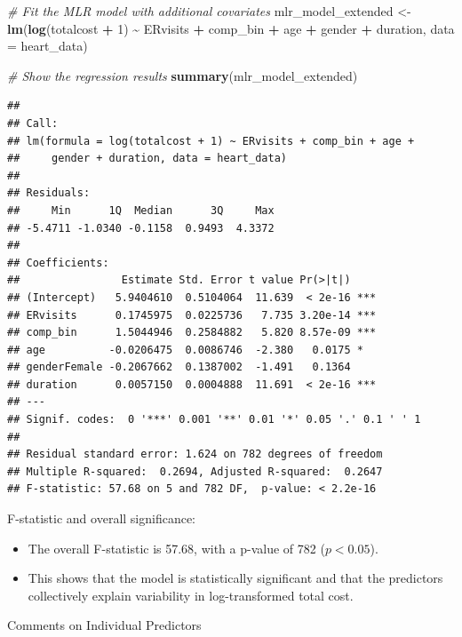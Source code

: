 \documentclass[
]{article}
\newenvironment{Shaded}{\begin{snugshade}}{\end{snugshade}}
\newcommand{\AttributeTok}[1]{\textcolor[rgb]{0.13,0.29,0.53}{#1}}
\newcommand{\CommentTok}[1]{\textcolor[rgb]{0.56,0.35,0.01}{\textit{#1}}}
\newcommand{\DecValTok}[1]{\textcolor[rgb]{0.00,0.00,0.81}{#1}}
\newcommand{\FunctionTok}[1]{\textcolor[rgb]{0.13,0.29,0.53}{\textbf{#1}}}
\newcommand{\NormalTok}[1]{#1}
\newcommand{\OtherTok}[1]{\textcolor[rgb]{0.56,0.35,0.01}{#1}}
\newcommand{\SpecialCharTok}[1]{\textcolor[rgb]{0.81,0.36,0.00}{\textbf{#1}}}
\begin{document}
\begin{Shaded}
\begin{Highlighting}[]
\CommentTok{\# Fit the MLR model with additional covariates}
\NormalTok{mlr\_model\_extended }\OtherTok{\textless{}{-}} \FunctionTok{lm}\NormalTok{(}\FunctionTok{log}\NormalTok{(totalcost }\SpecialCharTok{+} \DecValTok{1}\NormalTok{) }\SpecialCharTok{\textasciitilde{}}\NormalTok{ ERvisits }\SpecialCharTok{+}\NormalTok{ comp\_bin }\SpecialCharTok{+}\NormalTok{ age }\SpecialCharTok{+}\NormalTok{ gender }\SpecialCharTok{+}\NormalTok{ duration, }\AttributeTok{data =}\NormalTok{ heart\_data)}

\CommentTok{\# Show the regression results}
\FunctionTok{summary}\NormalTok{(mlr\_model\_extended)}
\end{Highlighting}
\end{Shaded}

\begin{verbatim}
## 
## Call:
## lm(formula = log(totalcost + 1) ~ ERvisits + comp_bin + age + 
##     gender + duration, data = heart_data)
## 
## Residuals:
##     Min      1Q  Median      3Q     Max 
## -5.4711 -1.0340 -0.1158  0.9493  4.3372 
## 
## Coefficients:
##                Estimate Std. Error t value Pr(>|t|)    
## (Intercept)   5.9404610  0.5104064  11.639  < 2e-16 ***
## ERvisits      0.1745975  0.0225736   7.735 3.20e-14 ***
## comp_bin      1.5044946  0.2584882   5.820 8.57e-09 ***
## age          -0.0206475  0.0086746  -2.380   0.0175 *  
## genderFemale -0.2067662  0.1387002  -1.491   0.1364    
## duration      0.0057150  0.0004888  11.691  < 2e-16 ***
## ---
## Signif. codes:  0 '***' 0.001 '**' 0.01 '*' 0.05 '.' 0.1 ' ' 1
## 
## Residual standard error: 1.624 on 782 degrees of freedom
## Multiple R-squared:  0.2694, Adjusted R-squared:  0.2647 
## F-statistic: 57.68 on 5 and 782 DF,  p-value: < 2.2e-16
\end{verbatim}

F-statistic and overall significance:

\begin{itemize}
\item
  The overall F-statistic is 57.68, with a p-value of 782
  (\(p < 0.05\)).
\item
  This shows that the model is statistically significant and that the
  predictors collectively explain variability in log-transformed total
  cost.
\end{itemize}

Comments on Individual Predictors
\end{document}
